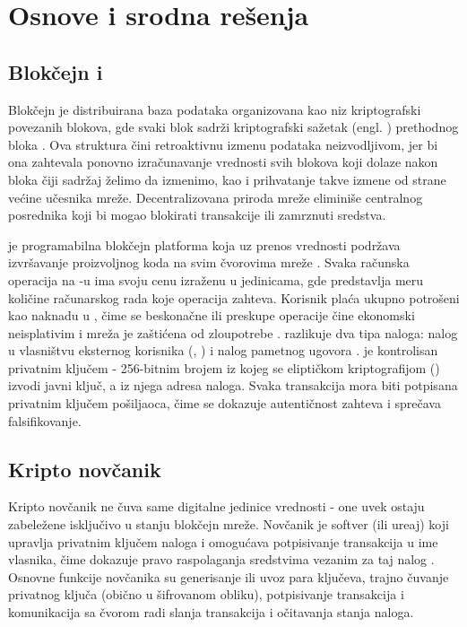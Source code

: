 \chapter{Osnove i srodna re\v senja}

\section{Blok\v cejn i }

Blok\v cejn je distribuirana baza podataka organizovana kao niz kriptografski povezanih blokova, gde svaki blok sadr\v zi kriptografski sa\v zetak (engl. ) prethodnog bloka \cite{buterin2014,nakamoto2008}. Ova struktura \v cini retroaktivnu izmenu podataka neizvodljivom, jer bi ona zahtevala ponovno izra\v cunavanje vrednosti svih blokova koji dolaze nakon bloka \v ciji sadr\v zaj \v zelimo da izmenimo, kao i prihvatanje takve izmene od strane ve\' cine u\v cesnika mre\v ze. Decentralizovana priroda mre\v ze elimini\v se centralnog posrednika koji bi mogao blokirati transakcije ili zamrznuti sredstva.

 je programabilna blok\v cejn platforma koja uz prenos vrednosti podr\v zava izvr\v savanje proizvoljnog koda na svim \v cvorovima mre\v ze \cite{buterin2014}. Svaka ra\v cunska operacija na -u \cite{wood2024} ima svoju cenu izra\v zenu u  jedinicama, gde  predstavlja meru koli\v cine ra\v cunarskog rada koje operacija zahteva. Korisnik pla\' ca ukupno potro\v seni  kao naknadu u , \v cime se beskona\v cne ili preskupe operacije \v cine ekonomski neisplativim i mre\v za je za\v sti\' cena od zloupotrebe \cite{wood2024}.  razlikuje dva tipa naloga: nalog u vlasni\v stvu eksternog korisnika (, ) i nalog pametnog ugovora \cite{wood2024}.  je kontrolisan privatnim klju\v cem - 256-bitnim brojem iz kojeg se elipti\v ckom kriptografijom () \cite{wood2024} izvodi javni klju\v c, a iz njega adresa naloga. Svaka transakcija mora biti potpisana privatnim klju\v cem po\v siljaoca, \v cime se dokazuje autenti\v cnost zahteva i spre\v cava falsifikovanje.

\section{Kripto nov\v canik}

Kripto nov\v canik ne \v cuva same digitalne jedinice vrednosti - one uvek ostaju zabele\v zene isklju\v civo u stanju blok\v cejn mre\v ze. Nov\v canik je softver (ili ure\dj aj) koji upravlja privatnim klju\v cem naloga i omogu\' cava potpisivanje transakcija u ime vlasnika, \v cime dokazuje pravo raspolaganja sredstvima vezanim za taj nalog \cite{antonopoulos2018}. Osnovne funkcije nov\v canika su generisanje ili uvoz para klju\v ceva, trajno \v cuvanje privatnog klju\v ca (obi\v cno u \v sifrovanom obliku), potpisivanje transakcija i komunikacija sa  \v cvorom radi slanja transakcija i o\v citavanja stanja naloga.

